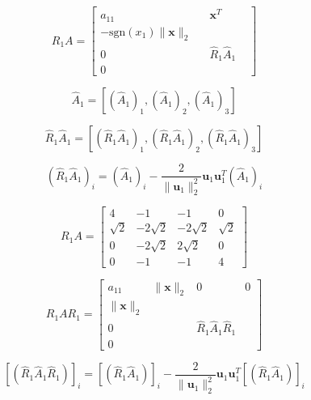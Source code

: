 \documentclass[a4paper,11pt]{article}
\begin{document}
\begin{equation}\label{key}
	R_1 A= \left[ 
	\begin{array}{c|ccc}
		a_{11} &  & \textbf{x}^T  &  \\
		\hline
		-\text{sgn}(x_1) \lVert \textbf{x}\rVert_2  &  &  &  \\
		0 &  & \hat{R}_1 \hat{A}_1 &  \\
		0 &  &  & 
	\end{array}\right] 
\end{equation}

\begin{equation}\label{key}
	\hat{A}_1 = \left[ ( \hat{A}_1)_1,( \hat{A}_1)_2,( \hat{A}_1)_3 \right] 
\end{equation}

\begin{equation}\label{key}
	\hat{R}_1\hat{A}_1 = \left[ ( \hat{R}_1\hat{A}_1)_1,( \hat{R}_1\hat{A}_1)_2,(\hat{R}_1 \hat{A}_1)_3 \right] 
\end{equation}

\begin{equation}\label{key}
	( \hat{R}_1\hat{A}_1)_i = (\hat{A}_1)_i - \frac{2}{\lVert \textbf{u}_1\rVert_2^2} \textbf{u}_1 \textbf{u}_1^T(\hat{A}_1)_i
\end{equation}

\begin{equation}\label{key}
	R_1 A = \begin{bmatrix}
		4 & -1 & -1 & 0 \\
		\sqrt{2} & -2\sqrt{2} & -2\sqrt{2} & \sqrt{2} \\
		0 & -2\sqrt{2} & 2\sqrt{2} & 0 \\
		0 & -1 & -1 & 4
	\end{bmatrix}
\end{equation}
	
	
\begin{equation}\label{key}
	R_1 A R_1 = \left[ 
	\begin{array}{c|ccc}
		a_{11} &  \lVert \textbf{x}\rVert_2 &  0 & 0 \\
		\hline
		 \lVert \textbf{x}\rVert_2  &  &  &  \\
		0 &  & \hat{R}_1 \hat{A}_1 \hat{R}_1  &  \\
		0 &  &  & 
	\end{array}\right] 
\end{equation}

\begin{equation}\label{key}
	\left[ (\hat{R}_1 \hat{A}_1 \hat{R}_1) \right]_i = 	\left[ (\hat{R}_1 \hat{A}_1 ) \right]_i  - \frac{2}{\lVert \textbf{u}_1\rVert_2^2} \textbf{u}_1 \textbf{u}_1^T	\left[ (\hat{R}_1 \hat{A}_1 ) \right]_i 
\end{equation}
\end{document}
